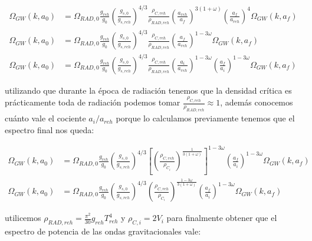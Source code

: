 \begin{equation*}
    \begin{split}
        \Omega_{GW} (k, a_0) &= \Omega_{RAD,0} \frac{g_{reh}}{g_{0}} \left( \frac{g_{s,0}}{g_{s,reh}} \right)^{4/3} \frac{\rho_{C,reh}}{\rho_{RAD,reh}} \left( \frac{a_{reh}}{a_{f}} \right)^{3(1 + \omega)} \left( \frac{a_f}{a_{reh}} \right)^4 \Omega_{GW} \left( k, a_f \right)\\
        \Omega_{GW} (k, a_0) &= \Omega_{RAD,0} \frac{g_{reh}}{g_{0}} \left( \frac{g_{s,0}}{g_{s,reh}} \right)^{4/3} \frac{\rho_{C,reh}}{\rho_{RAD,reh}} \left( \frac{a_{f}}{a_{reh}} \right)^{1 - 3 \omega} \Omega_{GW} \left( k, a_f \right)\\
        \Omega_{GW} (k, a_0) &= \Omega_{RAD,0} \frac{g_{reh}}{g_{0}} \left( \frac{g_{s,0}}{g_{s,reh}} \right)^{4/3} \frac{\rho_{C,reh}}{\rho_{RAD,reh}} \left( \frac{a_i}{a_{reh}} \right)^{1 - 3 \omega} \left( \frac{a_{f}}{a_{i}} \right)^{1 - 3 \omega} \Omega_{GW} \left( k, a_f \right)
    \end{split}
\end{equation*}

\noindent
utilizando que durante la época de radiación tenemos que la densidad crítica es prácticamente toda de radiación podemos tomar $ \displaystyle \frac{\rho_{C,reh}}{\rho_{RAD,reh}} \approx 1$, además conocemos cuánto vale el cociente $a_i/a_{reh}$ porque lo calculamos previamente tenemos que el espectro final nos queda:

\begin{equation*}
    \begin{split}
        \Omega_{GW} (k, a_0) &= \Omega_{RAD,0} \frac{g_{reh}}{g_{0}} \left( \frac{g_{s,0}}{g_{s,reh}} \right)^{4/3} \left[ \left( \frac{\rho_{C,reh}}{\rho_{C_i}} \right)^{\frac{1}{3 (1 + \omega)}} \right]^{1 - 3 \omega} \left( \frac{a_{f}}{a_{i}} \right)^{1 - 3 \omega} \Omega_{GW} \left( k, a_f \right)\\
        \Omega_{GW} (k, a_0) &= \Omega_{RAD,0} \frac{g_{reh}}{g_{0}} \left( \frac{g_{s,0}}{g_{s,reh}} \right)^{4/3} \left( \frac{\rho_{C,reh}}{\rho_{C_i}} \right)^{\frac{1 - 3 \omega}{3 (1 + \omega)}} \left( \frac{a_{f}}{a_{i}} \right)^{1 - 3 \omega} \Omega_{GW} \left( k, a_f \right)
    \end{split}
\end{equation*}

\noindent
utilicemos $\rho_{RAD,reh} = \frac{\pi^2}{30} g_{reh} T^4_{reh}$ y $\rho_{C,i} = 2 V_i$ para finalmente obtener que el espectro de potencia de las ondas gravitacionales vale:

